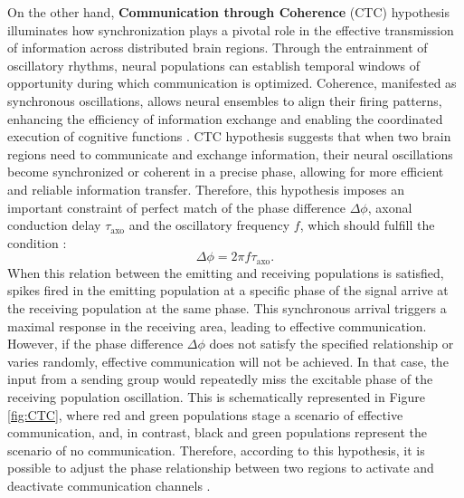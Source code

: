 \documentclass[../main.tex]{subfiles}
\begin{document}
On the other hand, \textbf{Communication through Coherence} (CTC) hypothesis illuminates how synchronization plays a pivotal role in the effective transmission of information across distributed brain regions.
Through the entrainment of oscillatory rhythms, neural populations can establish temporal windows of opportunity during which communication is optimized.
Coherence, manifested as synchronous oscillations, allows neural ensembles to align their firing patterns, enhancing the efficiency of information exchange and enabling the coordinated execution of cognitive functions \citep{fries_mechanism_2005,sancristobal_role_2014,fries_rhythms_2015}.
CTC hypothesis suggests that when two brain regions need to communicate and exchange information, their neural oscillations become synchronized or coherent in a precise phase, allowing for more efficient and reliable information transfer.
Therefore, this hypothesis imposes an important constraint of perfect match of the phase difference $\Delta\phi$, axonal conduction delay $\tau_\text{axo}$ and the oscillatory frequency $f$, which should fulfill the condition \citep{fries_mechanism_2005,sancristobal_role_2014}:
\begin{equation}
    \Delta\phi = 2\pi f\tau_\text{axo}.
    \label{eq:CTC-condition}
\end{equation}
When this relation between the emitting and receiving populations is satisfied, spikes fired in the emitting population at a specific phase of the signal %
arrive at the receiving population at the same phase.
This synchronous arrival triggers a maximal response in the receiving area, leading to effective communication.
However, if the phase difference $\Delta\phi$ does not satisfy the specified relationship or varies randomly, effective communication will not be achieved.
In that case, the input from a sending group would repeatedly miss the excitable phase of the receiving population oscillation.
This is schematically represented in Figure \ref{fig:CTC}, where red and green populations stage a scenario of effective communication, and, in contrast, black and green populations represent the scenario of no communication.
Therefore, according to this hypothesis, it is possible to adjust the phase relationship between two regions to activate and deactivate communication channels \citep{fries_rhythms_2015, fries_mechanism_2005,womelsdorf2006neuronal,womelsdorf_modulation_2007}.
\end{document}
